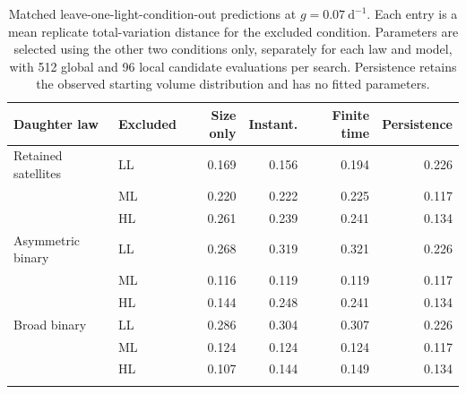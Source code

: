 \begin{table}[H]
\centering\small
\caption{Matched leave-one-light-condition-out predictions at $g=0.07~\mathrm{d^{-1}}$. Each entry is a mean replicate total-variation distance for the excluded condition. Parameters are selected using the other two conditions only, separately for each law and model, with 512 global and 96 local candidate evaluations per search. Persistence retains the observed starting volume distribution and has no fitted parameters.}
\label{tab:matched-predictions}
\setlength{\tabcolsep}{3pt}
\begin{tabular}{llrrrr}
\toprule
Daughter law & Excluded & Size only & Instant. & Finite time & Persistence \\
\midrule
Retained satellites & LL & 0.169 & 0.156 & 0.194 & 0.226 \\
 & ML & 0.220 & 0.222 & 0.225 & 0.117 \\
 & HL & 0.261 & 0.239 & 0.241 & 0.134 \\
\addlinespace
Asymmetric binary & LL & 0.268 & 0.319 & 0.321 & 0.226 \\
 & ML & 0.116 & 0.119 & 0.119 & 0.117 \\
 & HL & 0.144 & 0.248 & 0.241 & 0.134 \\
\addlinespace
Broad binary & LL & 0.286 & 0.304 & 0.307 & 0.226 \\
 & ML & 0.124 & 0.124 & 0.124 & 0.117 \\
 & HL & 0.107 & 0.144 & 0.149 & 0.134 \\
\addlinespace
\bottomrule
\end{tabular}
\end{table}
